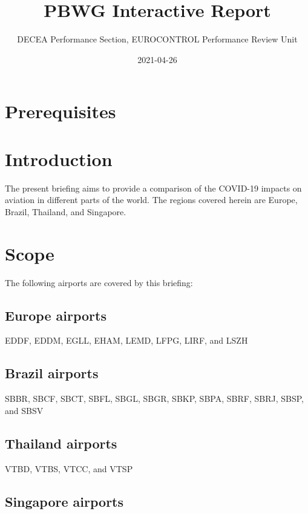 \documentclass[
]{book}
\title{PBWG Interactive Report}
\author{DECEA Performance Section, EUROCONTROL Performance Review Unit}
\date{2021-04-26}
\begin{document}
\maketitle

{
\setcounter{tocdepth}{1}
\tableofcontents
}
\hypertarget{prerequisites}{%
\chapter{Prerequisites}\label{prerequisites}}

\hypertarget{introduction}{%
\chapter{Introduction}\label{introduction}}

The present briefing aims to provide a comparison of the COVID-19 impacts on aviation in different parts of the world. The regions covered herein are Europe, Brazil, Thailand, and Singapore.

\hypertarget{scope}{%
\chapter{Scope}\label{scope}}

The following airports are covered by this briefing:

\hypertarget{europe-airports}{%
\section{Europe airports}\label{europe-airports}}

EDDF, EDDM, EGLL, EHAM, LEMD, LFPG, LIRF, and LSZH

\hypertarget{brazil-airports}{%
\section{Brazil airports}\label{brazil-airports}}

SBBR, SBCF, SBCT, SBFL, SBGL, SBGR, SBKP, SBPA, SBRF, SBRJ, SBSP, and SBSV

\hypertarget{thailand-airports}{%
\section{Thailand airports}\label{thailand-airports}}

VTBD, VTBS, VTCC, and VTSP

\hypertarget{singapore-airports}{%
\section{Singapore airports}\label{singapore-airports}}
\end{document}
